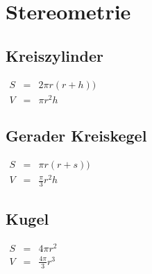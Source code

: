 \documentclass[10pt, a4paper, twocolumn]{scrartcl}
\begin{document}
\appendix

\section{Stereometrie}

\subsection{Kreiszylinder}

$
\begin{array}{lll}
 S&	=&	2\pi r(r+h))\\
 V&	=&	\pi r^2 h
\end{array}
$
\subsection{Gerader Kreiskegel}

$
\begin{array}{lll}
 S&	=&	\pi r(r+s))\\
 V&	=&	\frac{\pi}{3} r^2 h
\end{array}
$
\subsection{Kugel}

$
\begin{array}{lll}
 S&	=&	4\pi r^2\\
 V&	=&	\frac{4\pi}{3} r^3
\end{array}
$
\end{document}
